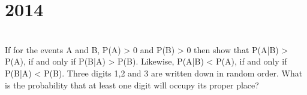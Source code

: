 \section*{2014}
\vspace{-.5cm}
\hrulefill \smallskip\\
 If for the events A and B, P(A) > 0 and P(B) > 0 then show that P(A|B) > P(A), if and only if P(B|A) > P(B). Likewise, P(A|B) < P(A), if and only if P(B|A) < P(B). 
\myline
{} Three digits 1,2 and 3 are written down in random order. What is the probability that at least one digit will occupy its proper place?